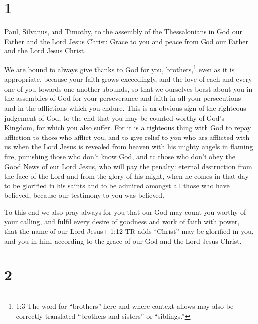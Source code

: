 \hypertarget{section}{%
\section{1}\label{section}}

 Paul, Silvanus, and Timothy, to the assembly of the
Thessalonians in God our Father and the Lord Jesus Christ: 
Grace to you and peace from God our Father and the Lord Jesus Christ.

 We are bound to always give thanks to God for you,
brothers,\footnote{1:3 The word for ``brothers'' here and where context
  allows may also be correctly translated ``brothers and sisters'' or
  ``siblings.''} even as it is appropriate, because your faith grows
exceedingly, and the love of each and every one of you towards one
another abounds,  so that we ourselves boast about you in
the assemblies of God for your perseverance and faith in all your
persecutions and in the afflictions which you endure.  This
is an obvious sign of the righteous judgement of God, to the end that
you may be counted worthy of God's Kingdom, for which you also suffer.
 For it is a righteous thing with God to repay affliction to
those who afflict you,  and to give relief to you who are
afflicted with us when the Lord Jesus is revealed from heaven with his
mighty angels in flaming fire,  punishing those who don't
know God, and to those who don't obey the Good News of our Lord Jesus,
 who will pay the penalty: eternal destruction from the face
of the Lord and from the glory of his might,  when he comes
in that day to be glorified in his saints and to be admired amongst all
those who have believed, because our testimony to you was believed.

 To this end we also pray always for you that our God may
count you worthy of your calling, and fulfil every desire of goodness
and work of faith with power,  that the name of our Lord
Jesus+ 1:12 TR adds ``Christ'' may be glorified in you, and you in him,
according to the grace of our God and the Lord Jesus Christ.

\hypertarget{section-1}{%
\section{2}\label{section-1}}

